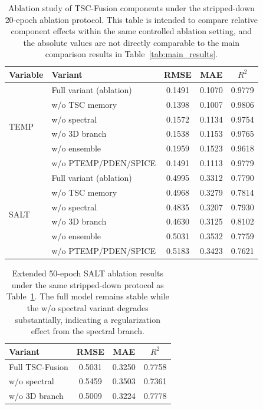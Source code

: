 \documentclass[conference]{IEEEtran}
\begin{document}
\begin{table}[t]
\centering
\caption{Ablation study of TSC-Fusion components under the stripped-down 20-epoch ablation protocol. This table is intended to compare relative component effects within the same controlled ablation setting, and the absolute values are not directly comparable to the main comparison results in Table~\ref{tab:main_results}.}
\label{tab:ablation}
\footnotesize
\renewcommand{\arraystretch}{1.08}
\begin{tabular}{@{}llccc@{}}
\toprule
\textbf{Variable} & \textbf{Variant} & \textbf{RMSE} & \textbf{MAE} & \textbf{$R^2$} \\
\midrule
\multirow{6}{*}{TEMP}
& Full variant (ablation) & 0.1491 & 0.1070 & 0.9779 \\
& w/o TSC memory & 0.1398 & 0.1007 & 0.9806 \\
& w/o spectral   & 0.1572 & 0.1134 & 0.9754 \\
& w/o 3D branch  & 0.1538 & 0.1153 & 0.9765 \\
& w/o ensemble   & 0.1959 & 0.1523 & 0.9618 \\
& w/o PTEMP/PDEN/SPICE & 0.1491 & 0.1113 & 0.9779 \\
\midrule
\multirow{6}{*}{SALT}
& Full variant (ablation) & 0.4995 & 0.3312 & 0.7790 \\
& w/o TSC memory & 0.4968 & 0.3279 & 0.7814 \\
& w/o spectral   & 0.4835 & 0.3207 & 0.7930 \\
& w/o 3D branch  & 0.4630 & 0.3125 & 0.8102 \\
& w/o ensemble   & 0.5031 & 0.3532 & 0.7759 \\
& w/o PTEMP/PDEN/SPICE & 0.5183 & 0.3423 & 0.7621 \\
\bottomrule
\end{tabular}
\end{table}

\begin{table}[t]
\centering
\caption{Extended 50-epoch SALT ablation results under the same stripped-down protocol as Table~\ref{tab:ablation}. The full model remains stable while the w/o spectral variant degrades substantially, indicating a regularization effect from the spectral branch.}
\label{tab:ablation_extended}
\footnotesize
\renewcommand{\arraystretch}{1.08}
\begin{tabular}{@{}lccc@{}}
\toprule
\textbf{Variant} & \textbf{RMSE} & \textbf{MAE} & \textbf{$R^2$} \\
\midrule
Full TSC-Fusion & 0.5031 & 0.3250 & 0.7758 \\
w/o spectral    & 0.5459 & 0.3503 & 0.7361 \\
w/o 3D branch   & 0.5009 & 0.3224 & 0.7778 \\
\bottomrule
\end{tabular}
\end{table}
\end{document}
